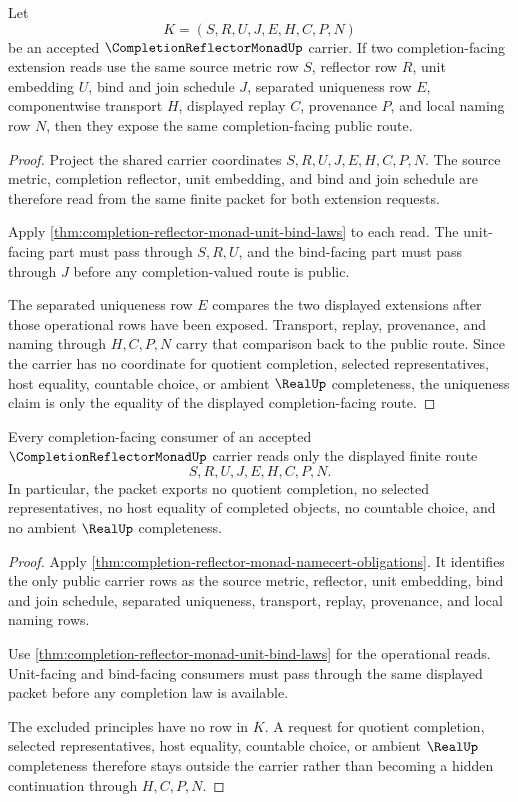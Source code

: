 \begin{theorem}
\label{thm:completion-reflector-monad-extension-uniqueness}
Let
$$
K=(S,R,U,J,E,H,C,P,N)
$$
be an accepted $\CompletionReflectorMonadUp$ carrier. If two completion-facing extension reads use the same source metric row $S$, reflector row $R$, unit embedding $U$, bind and join schedule $J$, separated uniqueness row $E$, componentwise transport $H$, displayed replay $C$, provenance $P$, and local naming row $N$, then they expose the same completion-facing public route.
\end{theorem}
\begin{proof}
Project the shared carrier coordinates $S,R,U,J,E,H,C,P,N$. The source metric, completion reflector, unit embedding, and bind and join schedule are therefore read from the same finite packet for both extension requests.

Apply \autoref{thm:completion-reflector-monad-unit-bind-laws} to each read. The unit-facing part must pass through $S,R,U$, and the bind-facing part must pass through $J$ before any completion-valued route is public.

The separated uniqueness row $E$ compares the two displayed extensions after those operational rows have been exposed. Transport, replay, provenance, and naming through $H,C,P,N$ carry that comparison back to the public route. Since the carrier has no coordinate for quotient completion, selected representatives, host equality, countable choice, or ambient $\RealUp$ completeness, the uniqueness claim is only the equality of the displayed completion-facing route.
\end{proof}

\begin{theorem}
\label{thm:completion-reflector-monad-nonescape}
Every completion-facing consumer of an accepted $\CompletionReflectorMonadUp$ carrier reads only the displayed finite route
$$
S,R,U,J,E,H,C,P,N .
$$
In particular, the packet exports no quotient completion, no selected representatives, no host equality of completed objects, no countable choice, and no ambient $\RealUp$ completeness.
\end{theorem}
\begin{proof}
Apply \autoref{thm:completion-reflector-monad-namecert-obligations}. It identifies the only public carrier rows as the source metric, reflector, unit embedding, bind and join schedule, separated uniqueness, transport, replay, provenance, and local naming rows.

Use \autoref{thm:completion-reflector-monad-unit-bind-laws} for the operational reads. Unit-facing and bind-facing consumers must pass through the same displayed packet before any completion law is available.

The excluded principles have no row in $K$. A request for quotient completion, selected representatives, host equality, countable choice, or ambient $\RealUp$ completeness therefore stays outside the carrier rather than becoming a hidden continuation through $H,C,P,N$.
\end{proof}

